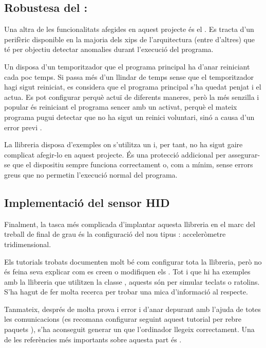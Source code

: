 \subsection{Robustesa del : }

Una altra de les funcionalitats afegides en aquest projecte és el .
Es tracta d'un perifèric disponible en la majoria dels xips de l'arquitectura
 (entre d'altres) que té per objectiu detectar anomalies durant
l'execució del programa.

Un  disposa d'un temporitzador que el programa principal ha d'anar
reiniciant cada poc temps. Si passa més d'un llindar de temps sense que el
temporitzador hagi sigut reiniciat, es considera que el programa principal s'ha
quedat penjat i el  actua. Es pot configurar perquè actuï de
diferents maneres, però la més senzilla i popular és reiniciant el programa
sencer amb un  activat, perquè el mateix programa pugui detectar que
no ha sigut un reinici voluntari, sinó a causa d'un error previ \cite{Watchdog}.

La llibreria  disposa d'exemples on s'utilitza un  i,
per tant, no ha sigut gaire complicat afegir-lo en aquest projecte. És una
protecció addicional per assegurar-se que el dispositiu sempre funciona
correctament o, com a mínim, sense errors greus que no permetin l'execució
normal del programa.

\subsection{Implementació del sensor HID}

Finalment, la tasca més complicada d'implantar aquesta llibreria en el marc
del treball de final de grau és la configuració del nou tipus :
acceleròmetre tridimensional.

Els tutorials trobats documenten molt bé com configurar tota la llibreria,
però no és feina seva explicar com es creen o modifiquen els .
Tot i que hi ha exemples amb la llibreria que utilitzen la classe ,
aquests són per simular teclats o ratolins. S'ha hagut de fer molta recerca per
trobar una mica d'informació al respecte.

Tanmateix, després de molta prova i error i d'anar depurant amb l'ajuda de
 totes les comunicacions (es recomana configurar 
seguint aquest tutorial per rebre paquets 
\cite{InstallWireshark}), s'ha aconseguit
generar un  que l'ordinador llegeix correctament.
Una de les referències més importants sobre aquesta part és \cite{VusbProjects}.

